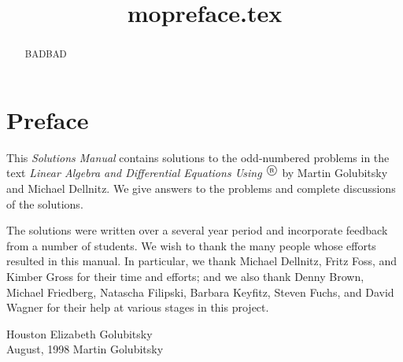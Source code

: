 \documentclass{ximera}
\title{mopreface.tex}
\begin{document}
\begin{abstract}
BADBAD
\end{abstract}
\maketitle

\large

\section*{Preface}

This {\em Solutions Manual\/} contains solutions to the odd-numbered 
problems in the text {\em Linear Algebra and Differential Equations Using
\Matlabp$^\tm$} by Martin Golubitsky and Michael Dellnitz.  We give 
answers to the problems and complete discussions of the solutions.

\quad The solutions were written over a several year period and incorporate
feedback from a number of students.   We wish to thank the many people whose 
efforts resulted in this manual.  In particular, we thank Michael Dellnitz,  
Fritz Foss, and Kimber Gross for their time and efforts; and we also thank 
Denny Brown, Michael Friedberg, Natascha Filipski, Barbara Keyfitz, Steven 
Fuchs, and David Wagner for their help at various stages in this project.

\vspace{0.2in}

\noindent Houston \hfill Elizabeth Golubitsky \\
August, 1998  \hfill Martin Golubitsky



\normalsize
\end{document}
